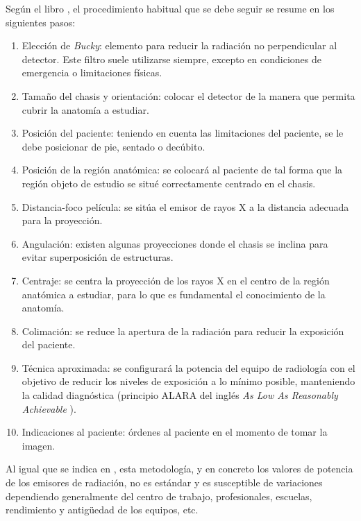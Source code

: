 Según el libro \cite{manualpractico}, el procedimiento habitual que se debe seguir se resume en los siguientes pasos:
\begin{enumerate}
    \item Elección de \emph{Bucky}: elemento para reducir la radiación no perpendicular al detector. Este filtro suele utilizarse siempre, excepto en condiciones de emergencia o limitaciones físicas.
    \item Tamaño del chasis y orientación: colocar el detector de la manera que permita cubrir la anatomía a estudiar.
    \item Posición del paciente: teniendo en cuenta las limitaciones del paciente, se le debe posicionar de pie, sentado o decúbito.
    \item Posición de la región anatómica: 
    se colocará al paciente de tal forma que la región objeto de estudio se situé correctamente centrado en el chasis.
    \item Distancia-foco película: se sitúa el emisor de rayos X a la distancia adecuada para la proyección.
    \item Angulación: existen algunas proyecciones donde el chasis se inclina para evitar superposición de estructuras.
    \item Centraje: se centra la proyección de los rayos X en el centro de la región anatómica a estudiar, para lo que es fundamental el conocimiento de la anatomía.
    \item Colimación: se reduce la apertura de la radiación para reducir la exposición del paciente.
    \item Técnica aproximada: se configurará la potencia del equipo de radiología con el objetivo de reducir los niveles de exposición a lo mínimo posible, manteniendo la calidad diagnóstica (principio ALARA del inglés \emph{As Low As Reasonably Achievable} \cite{manualpractico}). 
    \item Indicaciones al paciente: órdenes al paciente en el momento de tomar la imagen.
\end{enumerate}

Al igual que se indica en \cite{manualpractico}, esta metodología, y en concreto los valores de potencia de los emisores de radiación, no es estándar y es susceptible de variaciones dependiendo generalmente del centro de trabajo, profesionales, escuelas, rendimiento y antigüedad de los equipos, etc. 




